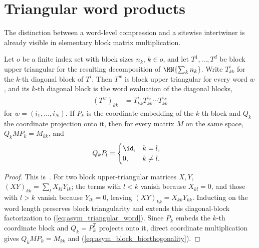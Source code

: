 \section{Triangular word products}%
\label{sec:asym_triangular}

The distinction between a word-level compression and a sitewise
intertwiner is already visible in elementary block matrix multiplication.

\begin{lemma}
    \label{lem:asym_triangular}
    \leanok
    Let $o$ be a finite index set with block sizes $n_k$, $k\in o$, and let
    $T^1,\ldots,T^d$ be block upper triangular for the resulting
    decomposition of $\MN{\sum_k n_k}$. Write $T^i_{kk}$ for the $k$-th
    diagonal block of $T^i$. Then $T^w$ is block upper triangular for every
    word $w$, and its $k$-th diagonal block is the word evaluation of the
    diagonal blocks,
    \begin{align}
        (T^w)_{kk} & =T^{i_1}_{kk}T^{i_2}_{kk}\cdots T^{i_N}_{kk}
        \label{eq:asym_triangular_word}
    \end{align}
    for $w=(i_1,\ldots,i_N)$. If $P_k$ is the coordinate embedding of the
    $k$-th block and $Q_k$ the coordinate projection onto it, then for every
    matrix $M$ on the same space, $Q_kMP_k=M_{kk}$, and
    \begin{align}
        Q_kP_l & =\begin{cases}\id, & k=l,\\0, & k\ne l.\end{cases}
        \label{eq:asym_block_biorthogonality}
    \end{align}
\end{lemma}

\begin{proof}
    \leanok
    This is~\cite[``Diagonal blocks of block-triangular
        products'']{QICLean2026Blueprint}.
    For two block upper-triangular matrices $X,Y$,
    $(XY)_{kk}=\sum_l X_{kl}Y_{lk}$; the terms with $l<k$ vanish because
    $X_{kl}=0$, and those with $l>k$ vanish because $Y_{lk}=0$, leaving
    $(XY)_{kk}=X_{kk}Y_{kk}$. Inducting on the word length preserves block
    triangularity and extends this diagonal-block factorization to
    (\ref{eq:asym_triangular_word}). Since $P_k$ embeds the $k$-th coordinate
    block and $Q_k=P_k^{\mathsf T}$ projects onto it, direct coordinate
    multiplication gives $Q_kMP_k=M_{kk}$ and
    (\ref{eq:asym_block_biorthogonality}).
\end{proof}

